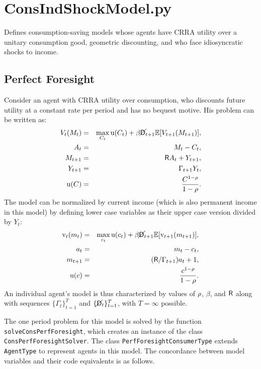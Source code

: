 \documentclass[12pt,titlepage,letterpaper]{econtex}
\newcommand{\E}{\mathbb{E}}
\begin{document}
\section{ConsIndShockModel.py}

Defines consumption-saving models whose agents have CRRA utility over a unitary consumption good, geometric discounting, and who face idiosyncratic shocks to income.

\subsection{Perfect Foresight}

Consider an agent with CRRA utility over consumption, who discounts future utility at a constant rate per period and has no bequest motive.  His problem can be written as:
\begin{eqnarray*}
V_t(M_t) &=& \max_{C_t} \utilFunc(C_t) + \beta \PLives_{t+1} \E [V_{t+1}(M_{t+1}) ], \\
A_t &=& M_t - C_t, \\
M_{t+1} &=& \Rfree A_t + Y_{t+1}, \\
Y_{t+1} &=& \Gamma_{t+1} Y_t, \\
\utilFunc(C) &=& \frac{C^{1-\CRRA}}{1-\CRRA}.
\end{eqnarray*}
The model can be normalized by current income (which is also permanent income in this model) by defining lower case variables as their upper case version divided by $Y_t$:
\begin{eqnarray*}
\vFunc_t(m_t) &=& \max_{c_t} \utilFunc(c_t) + \beta \PLives_{t+1} \E [\vFunc_{t+1}(m_{t+1}) ], \\
a_t &=& m_t - c_t, \\
m_{t+1} &=& (\Rfree/\Gamma_{t+1}) a_t + 1, \\
\utilFunc(c) &=& \frac{c^{1-\CRRA}}{1-\CRRA}.
\end{eqnarray*}
An individual agent's model is thus characterized by values of $\rho$, $\beta$, and $\mathsf{R}$ along with sequences $\{\Gamma_t\}_{t=1}^T$ and $\{\cancel{\mathsf{D}}_t\}_{t=1}^T$, with $T = \infty$ possible.

The one period problem for this model is solved by the function \texttt{solveConsPerfForesight}, which creates an instance of the class \texttt{ConsPerfForesightSolver}.  The class \texttt{PerfForesightConsumerType} extends \texttt{AgentType} to represent agents in this model. The concordance between model variables and their code equivalents is as follows.
\end{document}
